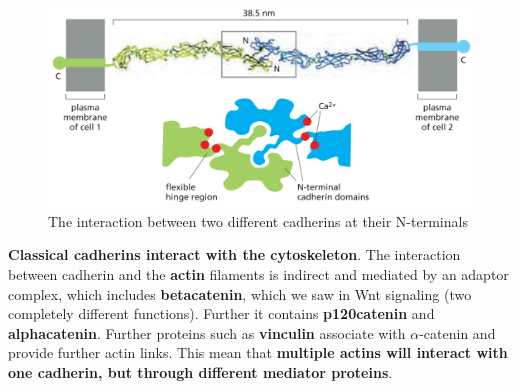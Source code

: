 \documentclass[../main.tex]{subfiles}
\begin{document}
\begin{figure}[H]
	\centering
	\includegraphics[width=0.6\linewidth]{cad_nter}
	\caption{The interaction between two different cadherins at their N-terminals}
	\label{fig:cadnter}
\end{figure}
\begin{figure}[H]
	\centering
	\hfill
	\caption{}
	\label{fig:cadCaInt}
\end{figure}

\textbf{Classical cadherins interact with the cytoskeleton}. The interaction between cadherin and the \textbf{\gls{actin}} filaments is indirect and mediated by an adaptor complex, which includes \textbf
{\gls{betacatenin}}, which we saw in Wnt signaling (two completely different functions). Further it contains \textbf{\gls{p120catenin}} and \textbf{\gls{alphacatenin}}. Further proteins such as \textbf{\gls{vinculin}} associate with $\alpha$-catenin and provide further actin links. This mean that \textbf{multiple actins will interact with one cadherin, but through different mediator proteins}. \\
\end{document}
